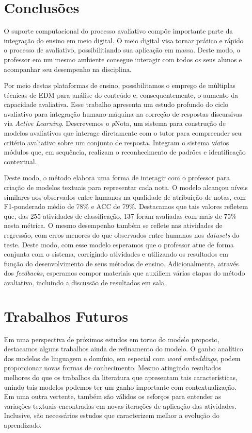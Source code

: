 \newpage

\section{Conclusões}

O suporte computacional do processo avaliativo compõe importante parte da integração do ensino em meio digital. O meio digital visa tornar prático e rápido o processo de avaliativo, possibilitiando sua aplicação em massa. Deste modo, o professor em um mesmo ambiente consegue interagir com todos os seus alunos e acompanhar seu desempenho na disciplina. 

Por meio destas plataformas de ensino, possibilitamos o emprego de múltiplas técnicas de EDM para análise do conteúdo e, consequentemente, o aumento da capacidade avaliativa. Esse trabalho apresenta um estudo profundo do ciclo avaliativo para integração humano-máquina na correção de respostas discursivas via \textit{Active Learning}. Descrevemos o \textit{p}Nota, um sistema para construção de modelos avaliativos que interage diretamente com o tutor para compreender seu critério avaliativo sobre um conjunto de resposta. Integram o sistema vários módulos que, em sequência, realizam o reconhecimento de padrões e identificação contextual.

Deste modo, o método elabora uma forma de interagir com o professor para criação de modelos textuais para representar cada nota. O modelo alcançou níveis similares aos observados entre humanos na qualidade de atribuição de notas, com F1-ponderado médio de 78\% e ACC de 79\%. Destacamos que tais valores refletem que, das 255 atividades de classificação, 137 foram avaliadas com mais de 75\% nesta métrica. O mesmo desempenho também se reflete nas atividades de regressão, com erros menores do que observados entre humanos nos \textit{datasets} do teste. Deste modo, com esse modelo esperamos que o professor atue de forma conjunta com o sistema, corrigindo atividades e utilizando os resultados em função do desenvolvimento de seus métodos de ensino. Adicionalmente, através dos \textit{feedbacks}, esperamos compor materiais que auxiliem várias etapas do método avaliativo, incluindo a discussão de resultados em sala.

\section{Trabalhos Futuros}

Em uma perspectiva de próximos estudos em torno do modelo proposto, destacamos alguns trabalhos ainda de refinamento do modelo. O ganho analítico dos modelos de linguagem e domínio, em especial com \textit{word embeddings}, podem proporcionar novas formas de conhecimento. Mesmo atingindo resultados melhores do que os trabalhos da literatura que apresentam tais características, unindo tais modelos podemos ter um ganho importante com contextualização. Em uma outra vertente, também são válidos os esforços para entender as variações textuais encontradas em novas iterações de aplicação das atividades. Inclusive, são necessários estudos que caracterizem melhor a evolução do aprendizado.

